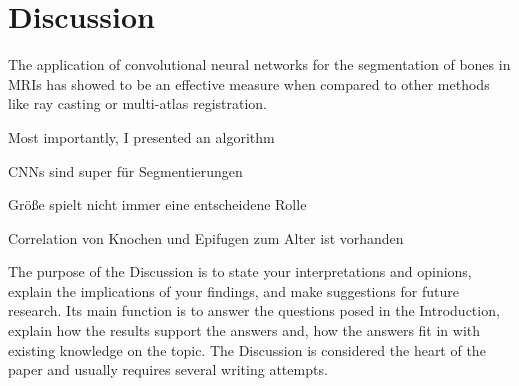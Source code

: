 \section{Discussion}

The application of convolutional neural networks for the segmentation of bones in MRIs has showed to be an effective measure when compared to other methods like ray casting or multi-atlas registration.

Most importantly, I presented an algorithm


CNNs sind super für Segmentierungen

Größe spielt nicht immer eine entscheidene Rolle

Correlation von Knochen und Epifugen zum Alter ist vorhanden




The purpose of the Discussion is to state your interpretations and opinions, explain the
implications of your findings, and make suggestions for future research. Its main
function is to answer the questions posed in the Introduction, explain how the results
support the answers and, how the answers fit in with existing knowledge on the topic.
The Discussion is considered the heart of the paper and usually requires several writing
attempts. 



\newpage